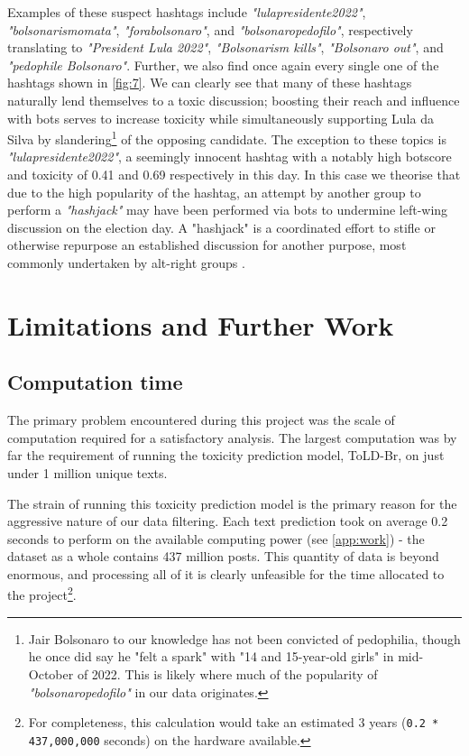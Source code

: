 \documentclass[a4paper,11pt]{article}  %
\begin{document}
	Examples of these suspect hashtags include \textit{"lulapresidente2022"}, \textit{"bolsonarismomata"}, \textit{"forabolsonaro"}, and \textit{"bolsonaropedofilo"}, respectively translating to \textit{"President Lula 2022"}, \textit{"Bolsonarism kills"}, \textit{"Bolsonaro out"}, and \textit{"pedophile Bolsonaro"}. Further, we also find once again every single one of the hashtags shown in \autoref{fig:7}.  We can clearly see that many of these hashtags naturally lend themselves to a toxic discussion; boosting their reach and influence with bots serves to increase toxicity while simultaneously supporting Lula da Silva by slandering\footnote{Jair Bolsonaro to our knowledge has not been convicted of pedophilia, though he once did say he "felt a spark" with "14 and 15-year-old girls" in mid-October of 2022\parencite{BolsonaroSaysHe2022}. This is likely where much of the popularity of \textit{"bolsonaropedofilo"} in our data originates.} of the opposing candidate. The exception to these topics is \textit{"lulapresidente2022"}, a seemingly innocent hashtag with a notably high botscore and toxicity of 0.41 and 0.69 respectively in this day. In this case we theorise that due to the high popularity of the hashtag, an attempt by another group to perform a \textit{"hashjack"} may have been performed via bots to undermine left-wing discussion on the election day. A "hashjack" is a coordinated effort to stifle or otherwise repurpose an established discussion for another purpose, most commonly undertaken by alt-right groups \parencite{dariusHowFarRightPolarises2022}.
	
	\section{Limitations and Further Work}
	\subsection{Computation time}
	\label{subsec:computation}
	The primary problem encountered during this project was the scale of computation required for a satisfactory analysis. The largest computation was by far the requirement of running the toxicity prediction model, ToLD-Br\parencite{leiteToxicLanguageDetection2020}, on just under 1 million unique texts.
	
	The strain of running this toxicity prediction model is the primary reason for the aggressive nature of our data filtering. Each text prediction took on average 0.2 seconds to perform on the available computing power (see \autoref{app:work}) - the dataset as a whole contains 437 million posts. This quantity of data is beyond enormous, and processing all of it is clearly unfeasible for the time allocated to the project\footnote{For completeness, this calculation would take an estimated 3 years (\texttt{0.2 * 437,000,000} seconds) on the hardware available.}.
\end{document}
